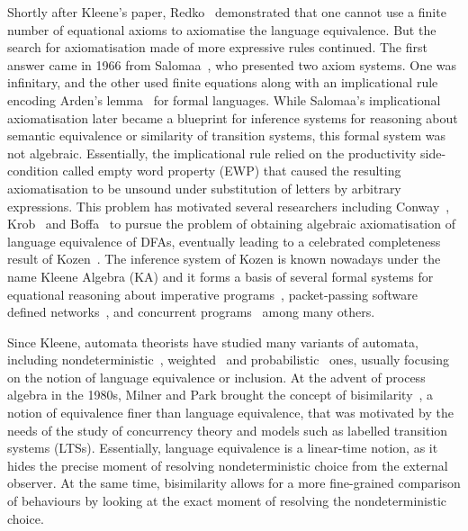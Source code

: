 Shortly after Kleene's paper, Redko~\cite{Redko:1964:Defining} demonstrated that one cannot use a finite number of equational axioms to axiomatise the language equivalence. But the search for axiomatisation made of more expressive rules continued. The first answer came in 1966 from Salomaa~\cite{Salomaa:1966:Two}, who presented two axiom systems. One was infinitary, and the other used finite equations along with an implicational rule encoding Arden's lemma~\cite{Arden:1961:Delayed} for formal languages. While Salomaa's implicational axiomatisation later became a blueprint for inference systems for reasoning about semantic equivalence or similarity of transition systems, this formal system was not algebraic. Essentially, the implicational rule relied on the productivity side-condition called empty word property (EWP) that caused the resulting axiomatisation to be unsound under substitution of letters by arbitrary expressions. This problem has motivated several researchers including Conway~\cite{Conway:2012:Regular}, Krob~\cite{Krob:1990:Complete} and Boffa~\cite{Boffa:1990:Une} to pursue the problem of obtaining algebraic axiomatisation of language equivalence of DFAs, eventually leading to a celebrated completeness result of Kozen~\cite{Kozen:1994:Completeness}. The inference system of Kozen is known nowadays under the name Kleene Algebra (KA) and it forms a basis of several formal systems for equational reasoning about imperative programs~\cite{Kozen:1996:Kleene}, packet-passing software defined networks~\cite{Anderson:2014:NetKAT}, and concurrent programs~\cite{Kappe:2017:Concurrent,Wagemaker:2019:Completeness} among many others.

Since Kleene, automata theorists have studied many variants of automata, including nondeterministic~\cite{Rabin:1959:Finite}, weighted~\cite{Schutzenberger:1961:Definition} and probabilistic~\cite{Rabin:1963:Probabilistic} ones, usually focusing on the notion of language equivalence or inclusion. At the advent of process algebra in the 1980s, Milner and Park brought the concept of bisimilarity~\cite{Park:1981:Concurrency}, a notion of equivalence finer than language equivalence, that was motivated by the needs of the study of concurrency theory and models such as labelled transition systems (LTSs). Essentially, language equivalence is a linear-time notion, as it hides the precise moment of resolving nondeterministic choice from the external observer. At the same time, bisimilarity allows for a more fine-grained comparison of behaviours by looking at the exact moment of resolving the nondeterministic choice. 

